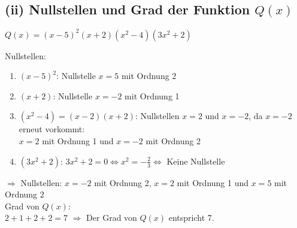 \documentclass{article}
\begin{document}
\subsection{(ii) Nullstellen und Grad der Funktion $Q(x)$}
\begin{center}
    $Q(x)=(x-5)^2(x+2)(x^2-4)(3x^2+2)$ 
\end{center}
Nullstellen:  \\
    \begin{enumerate}
        \item $(x-5)^2$: Nullstelle $x=5$ mit Ordnung 2 
        \item $(x+2)$: Nullstelle $x=-2$ mit Ordnung 1 
        \item $(x^2-4) = (x-2)(x+2)$: Nullstellen $x=2$ und $x=-2$, da $x=-2$ erneut vorkommt: \\
         $x=2$ mit Ordnung 1 und $x=-2$ mit Ordnung 2 
        \item $(3x^2+2)$:  $3x^2+2=0 \Longleftrightarrow x^2=-\frac{2}{3} \Longleftrightarrow$ Keine Nullstelle
    \end{enumerate}
    $\Longrightarrow$ Nullstellen: $x=-2$ mit Ordnung 2, $x=2$ mit Ordnung 1 und $x=5$ mit Ordnung 2 \\
\newline 
Grad von $Q(x)$: \\
$2+1+2+2=7$
$\Longrightarrow$ Der Grad von $Q(x)$ entspricht 7.
\end{document}
